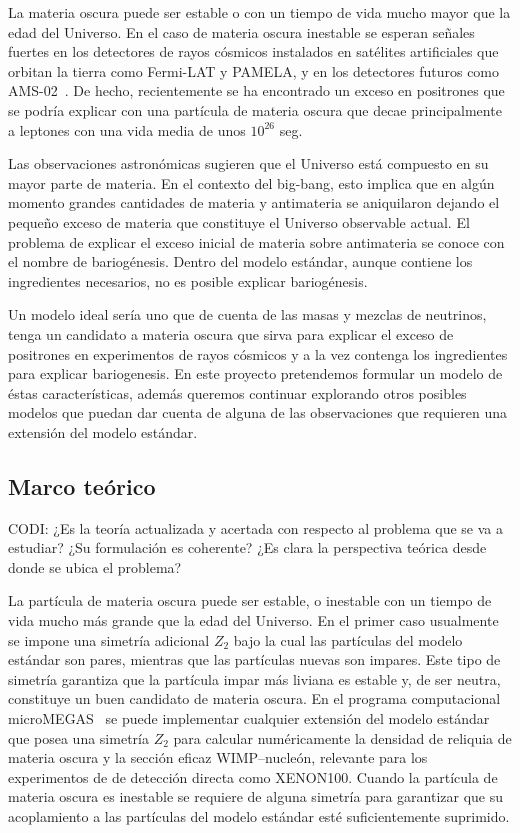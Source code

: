La materia oscura puede ser estable o con un tiempo de vida mucho
mayor que la edad del Universo. En el caso de materia oscura inestable
se esperan señales fuertes en los detectores de rayos cósmicos
instalados en satélites artificiales que orbitan la tierra como
Fermi-LAT y PAMELA, y en los detectores futuros como
AMS-02~\cite{ams:2009}. De hecho, recientemente se ha encontrado un
exceso en positrones \cite{Adriani:2008zr} que se podría explicar con
una partícula de materia oscura que decae principalmente a leptones
con una vida media de unos $10^{26}$ seg.

Las observaciones astronómicas sugieren que el Universo está compuesto
en su mayor parte de materia. En el contexto del big-bang, esto
implica que en algún momento grandes cantidades de materia y
antimateria se aniquilaron dejando el pequeño exceso de materia que
constituye el Universo observable actual. El problema de explicar el
exceso inicial de materia sobre antimateria se conoce con el nombre de
bariogénesis. Dentro del modelo estándar, aunque contiene los
ingredientes necesarios, no es posible explicar bariogénesis.

Un modelo ideal sería uno que de cuenta de las masas y mezclas de
neutrinos, tenga un candidato a materia oscura que sirva para explicar
el exceso de positrones en experimentos de rayos cósmicos y a la vez
contenga los ingredientes para explicar bariogenesis. En este proyecto
pretendemos formular un modelo de éstas características, además
queremos continuar explorando otros posibles modelos que puedan dar
cuenta de alguna de las observaciones que requieren una extensión del
modelo estándar.
 

\subsection{Marco teórico}

\begin{instrucciones}
 CODI: ¿Es la teoría actualizada y acertada con respecto al problema que se va a estudiar? ¿Su formulación es coherente? ¿Es clara la perspectiva teórica desde donde se ubica el problema?
\end{instrucciones}

La partícula de materia oscura puede ser estable, o inestable con un
tiempo de vida mucho más grande que la edad del Universo. En el primer
caso usualmente se impone una simetría adicional $Z_2$ bajo la cual
las partículas del modelo estándar son pares, mientras que las
partículas nuevas son impares. Este tipo de simetría garantiza que la
partícula impar más liviana es estable y, de ser neutra, constituye un
buen candidato de materia oscura. En el programa computacional
microMEGAS~\cite{Belanger:2006is} se puede implementar cualquier
extensión del modelo estándar que posea una simetría $Z_2$ para
calcular numéricamente la densidad de reliquia de materia oscura y la
sección eficaz WIMP--nucleón, relevante para los experimentos de de
detección directa como XENON100. Cuando la partícula de materia oscura
es inestable se requiere de alguna simetría para garantizar que su
acoplamiento a las partículas del modelo estándar esté suficientemente
suprimido.


